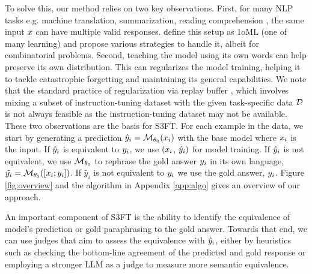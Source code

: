 To solve this, our method relies on two key observations.
First, for many NLP tasks e.g. machine translation, summarization, reading comprehension \etc, the same input $x$ can have multiple
valid responses. \citet{nandwani2020neural} define this setup as 1oML (one of many learning) and propose various strategies to handle it, albeit for combinatorial problems.
Second, teaching the model using its own words can help preserve its own distribution. This can regularizes the model training, helping it to tackle catastrophic forgetting and maintaining its general capabilities.
We note that the standard practice of regularization via replay buffer \cite{hayes2020remind},
which involves mixing a subset of instruction-tuning dataset with the given task-specific data $\mathcal{D}$ is not always feasible as the instruction-tuning dataset may not be available.
These two observations are the basis for S3FT.
For each example in the data, we start by generating a prediction $\hat{y}_i = \mathcal{M}_{\theta_0}(x_i)$ with the base model where $x_i$ is the input. 
If $\hat{y}_i$ is equivalent to $y_i$, we use $(x_i$, $\hat{y}_i)$ for model training. If $\hat{y}_i$ is not equivalent, we use $\mathcal{M}_{\theta_0}$ to rephrase the gold answer $y_i$ in its own language, $\tilde{y_i} = \mathcal{M}_{\theta_0}([x_i; y_i])$. If $\tilde{y_i}$ is not equivalent to $y_i$ we use the gold answer, $y_i$. Figure \ref{fig:overview} and the algorithm in Appendix \ref{app:algo} gives an overview of our approach.

An important component of S3FT is the ability to identify the equivalence of model's prediction or gold paraphrasing to the gold answer.
Towards that end, we can use judges that aim to assess the equivalence with $\hat{y}_i$, either by heuristics such as checking the bottom-line agreement of the predicted and gold response or employing a stronger LLM as a judge to measure more semantic equivalence.
